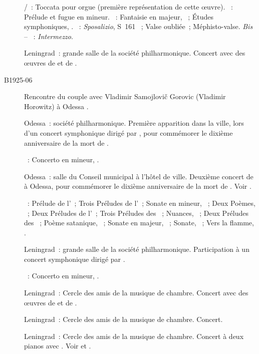 \begin{description}
 \textsc{\Pachelbel{}/\Nikolaiev{}}~: Toccata pour orgue (première
 représentation de cette œuvre).
 \textsc{\JBach{}}~: Prélude et fugue en \kB \Flat mineur.
 \textsc{\Schumann{}}~: Fantaisie en \kC majeur, ~; Études
 symphoniques, .
 \textsc{\Liszt{}}~: \emph{Sposalizio}, S~161 ~; Valse oubliée~;
 Méphisto-valse.
 \emph{Bis} -- \textsc{\Schumann{}}~: \emph{Intermezzo}.
 \item[\DateWithWeekDay{1925-05-23}]
 Leningrad~: grande salle de la société philharmonique.
 Concert avec des œuvres de \Chopin{} et de \Scriabine{}.
 \item[B1925-06]
 Rencontre du couple \Sofronitsky{} avec Vladimir Samojlovič Gorovic
 (Vladimir Horowitz) à Odessa \citep[voir][p.~56]{Juban}.
 \item[\DateWithWeekDay{1925-06-12}]
 Odessa~: société philharmonique.
 Première apparition dans la ville, lors d'un concert symphonique dirigé par
 \VBerdiaiev{}, pour commémorer le dixième anniversaire de la mort de
 \Scriabine{} \citep[voir][p.~152-153]{Nekrasova08}.

 \textsc{\Scriabine{}}~: Concerto en \kF \Sharp mineur, .
 \item[\DateWithWeekDay{1925-06-16}]
 Odessa~: salle du Conseil municipal à l'hôtel de ville.
 Deuxième concert de \VSofronitsky{} à Odessa, pour commémorer le dixième
 anniversaire de la mort de \Scriabine{}.
 Voir \citet[p.~424]{Milshteyn82a}.

 \textsc{\Scriabine{}}~: Prélude de l'~; Trois Préludes de
 l'~; Sonate en \kF \Sharp mineur, ~; Deux Poèmes,
 ~; Deux Préludes de l'~; Trois Préludes des ~; Nuances,  ~; Deux Préludes des ~; Poème satanique, ~; Sonate en \kF \Sharp majeur,
 ~; Sonate, ~; Vers la flamme, .
 \item[\DateWithWeekDay{1925-07-31}]
 Leningrad~: grande salle de la société philharmonique.
 Participation à un concert symphonique dirigé par \ECooper{}.

 \textsc{\Scriabine{}}~: Concerto en \kF \Sharp mineur, .
 \item[\DateWithWeekDay{1925-09-01}]
 Leningrad~: Cercle des amis de la musique de chambre.
 Concert avec des œuvres de \Schumann{} et de \Chopin{}.
 \item[\DateWithWeekDay{1925-09-25}]
 Leningrad~: Cercle des amis de la musique de chambre.
 Concert.
 \item[\DateWithWeekDay{1925-09-29}]
 Leningrad~: Cercle des amis de la musique de chambre.
 Concert à deux pianos avec \NGolubovskaya{}.
 Voir \citet[p.~435]{Milshteyn82a} et \citet[p.~397]{Scriabine}.


\end{description}
